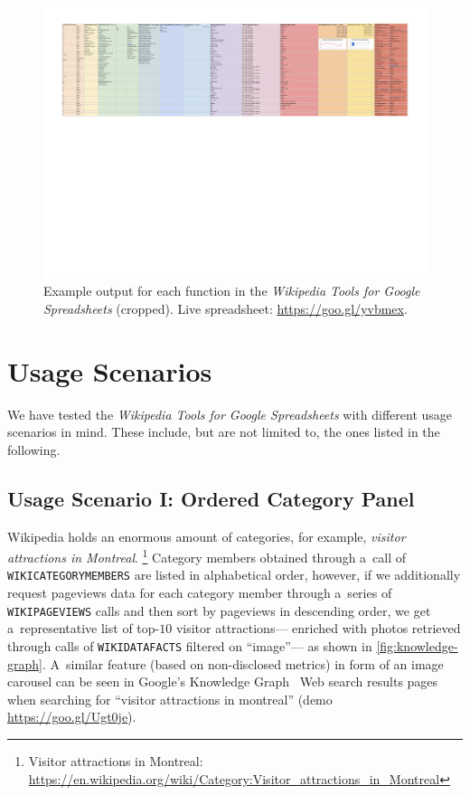 \documentclass{sig-alternate-05-2015}
\newcommand{\inlinelistingsize}{\fontsize{8pt}{11pt}}
\let\oldurl\url
\renewcommand{\url}[1]{\inlinelistingsize\oldurl{#1}}
\begin{document}
\begin{figure}
  \centering
  \includegraphics[width=\textwidth]{wikipedia-tools}
  \caption{Example output for each function in the \emph{Wikipedia Tools for Google Spreadsheets} (cropped). Live spreadsheet: \url{https://goo.gl/yvbmex}.}
  \label{fig:wikipedia-tools}
\end{figure}

\section{Usage Scenarios}

We have tested the \emph{Wikipedia Tools for Google Spreadsheets}
with different usage scenarios in mind.
These include, but are not limited to, the ones listed in the following.

\subsection{Usage Scenario I: Ordered Category Panel}

Wikipedia holds an enormous amount of categories, for example,
\emph{visitor attractions in Montreal}.%
\footnote{Visitor attractions in Montreal:
\url{https://en.wikipedia.org/wiki/Category:Visitor_attractions_in_Montreal}}
Category members obtained through a~call of \texttt{WIKICATEGORYMEMBERS}
are listed in alphabetical order,
however, if we additionally request pageviews data for each category member through a~series of \texttt{WIKIPAGEVIEWS} calls
and then sort by pageviews in descending order,
we get a~representative list of top-$10$ visitor attractions---%
enriched with photos retrieved through calls of \texttt{WIKIDATAFACTS} filtered on ``image''---%
as shown in \autoref{fig:knowledge-graph}.
A~similar feature (based on non-disclosed metrics) in form of an image carousel
can be seen in Google's Knowledge Graph~\cite{singhal2012} Web search results pages
when searching for ``visitor attractions in montreal'' (demo \url{https://goo.gl/Ugt0je}).
\end{document}
